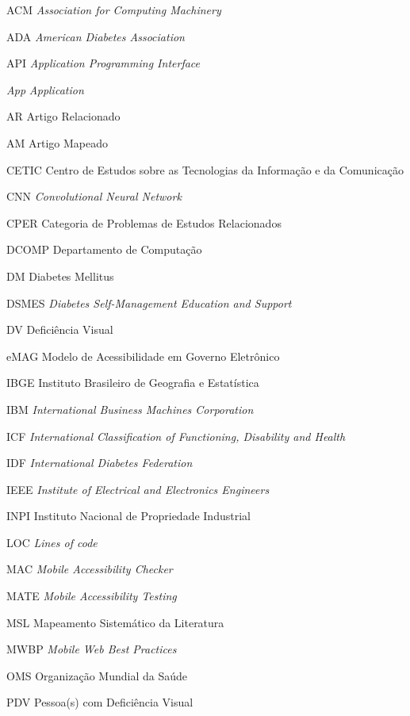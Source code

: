 
\begin{siglas}
	\item[ACM]{\textit{Association for Computing Machinery}}
	\item[ADA]{\textit{American Diabetes Association}}
	\item[API]{\textit{Application Programming Interface}}
	\item[\emph{App}]{\textit{Application}}
	\item[AR]{Artigo Relacionado}
	\item[AM]{Artigo Mapeado}
	\item[CETIC]{Centro de Estudos sobre as Tecnologias da Informação e da Comunicação}
	\item[CNN]{\textit{Convolutional Neural Network}}
	\item[CPER]{Categoria de Problemas de Estudos Relacionados}
	\item[DCOMP]{Departamento de Computação}
	\item[DM]{Diabetes Mellitus}
	\item[DSMES]{\textit{Diabetes Self-Management Education and Support}}
	\item[DV]{Deficiência Visual}
	\item[eMAG]{Modelo de Acessibilidade em Governo Eletrônico}
	\item[IBGE]{Instituto Brasileiro de Geografia e Estatística}
	\item[IBM]{\textit{International Business Machines Corporation}}
	\item[ICF]{\textit{International Classification of Functioning, Disability and Health}}
	\item[IDF]{\textit{International Diabetes Federation}}
	\item[IEEE]{\textit{Institute of Electrical and Electronics Engineers}}
	\item[INPI]{Instituto Nacional de Propriedade Industrial}
	\item[LOC]{\textit{Lines of code}}
	\item[MAC]{\textit{Mobile Accessibility Checker}}
	\item[MATE]{\textit{Mobile Accessibility Testing}}
	\item[MSL]{Mapeamento Sistemático da Literatura}
	\item[MWBP]{\textit{Mobile Web Best Practices}}
	\item[OMS]{Organização Mundial da Saúde}
	\item[PDV]{Pessoa(s) com Deficiência Visual}

\end{siglas}
